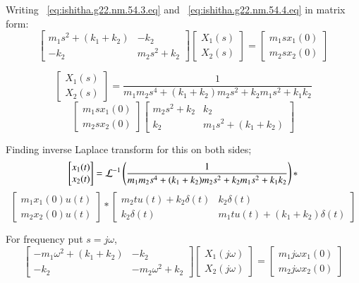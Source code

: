 \documentclass[journal,12pt,twocolumn]{IEEEtran}
\theoremstyle{remark}
\begin{document}
Writing ~\eqref{eq:ishitha.g22.nm.54.3.eq} and ~\eqref{eq:ishitha.g22.nm.54.4.eq} in matrix form:
\[
\begin{bmatrix}
m_1s^2+(k_1+k_2) & -k_2  \\
-k_2& m_2s^2+k_2
\end{bmatrix}
\begin{bmatrix}
X_1(s) \\
X_2(s)
\end{bmatrix}
=
\begin{bmatrix}
m_1sx_1(0) \\
m_2sx_2(0)
\end{bmatrix}
\]

\[
\begin{bmatrix}
X_1(s) \\
X_2(s)
\end{bmatrix}
= \frac{1}{m_1m_2s^4+(k_1+k_2)m_2s^2+k_2m_1s^2+k_1k_2} \]
\[
\begin{bmatrix}
m_1sx_1(0) \\
m_2sx_2(0)
\end{bmatrix}
\begin{bmatrix}
m_2s^2+k_2 & k_2  \\
k_2& m_1s^2+(k_1+k_2)
\end{bmatrix}
\]

Finding inverse Laplace transform for this on both sides;
\[
\begin{bmatrix}
x_1(t) \\
x_2(t)
\end{bmatrix}
= \mathcal{L}^{-1}\left(\frac{1}{m_1m_2s^4+(k_1+k_2)m_2s^2+k_2m_1s^2+k_1k_2} \right) * \]
\[
\begin{bmatrix}
m_1x_1(0)u(t) \\
m_2x_2(0)u(t)
\end{bmatrix}
*
\begin{bmatrix}
m_2tu(t) +k_2 \delta (t)& k_2\delta (t)  \\
k_2\delta (t)& m_1tu(t)+(k_1+k_2)\delta (t)
\end{bmatrix}
\]

For frequency put $s=j\omega$,
\[
\begin{bmatrix}
-m_1\omega ^2+(k_1+k_2) & -k_2  \\
-k_2& -m_2\omega ^2+k_2
\end{bmatrix}
\begin{bmatrix}
X_1(j\omega) \\
X_2(j\omega)
\end{bmatrix}
=
\begin{bmatrix}
m_1 j\omega x_1(0)\\
m_2 j\omega x_2(0)
\end{bmatrix}
\]
\end{document}
